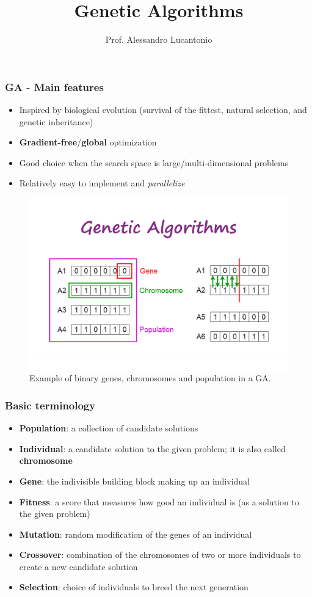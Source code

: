 \documentclass{beamer}
\title{Genetic Algorithms}
\author{Prof. Alessandro Lucantonio}
\institute{Aarhus University}
\date{}
\begin{document}
	\frame{\titlepage}
	
	\begin{frame}
		\frametitle{GA - Main features}
		\begin{itemize}
			\setlength\itemsep{5mm}
			\item Inspired by biological evolution (survival of the fittest, natural selection, and genetic inheritance)
			\item \textbf{Gradient-free}/\textbf{global} optimization
			\item Good choice when the search space is large/multi-dimensional problems
			\item Relatively easy to implement and \textit{parallelize}
		\end{itemize}
	\end{frame}
	

	\begin{frame}
		\begin{figure}
			\centering
			\includegraphics[scale=0.23]{images/ga}
			\caption{Example of binary genes, chromosomes and population in a GA.}
		\end{figure}
	\end{frame}

	

	\begin{frame}
		\frametitle{Basic terminology}
		\begin{itemize}
			\item \textbf{Population}: a collection of candidate solutions
			\item \textbf{Individual}: a candidate solution to the given problem; it is also called \textbf{chromosome}
			\item \textbf{Gene}: the indivisible building block making up an individual
			\item \textbf{Fitness}: a score that measures how good an individual is (as a solution to the given problem)
			\item \textbf{Mutation}: random modification of the genes of an individual
			\item \textbf{Crossover}: combination of the chromosomes of two or more individuals to create a new candidate solution
			\item \textbf{Selection}: choice of individuals to breed the next generation
		\end{itemize}
	\end{frame}
\end{document}
